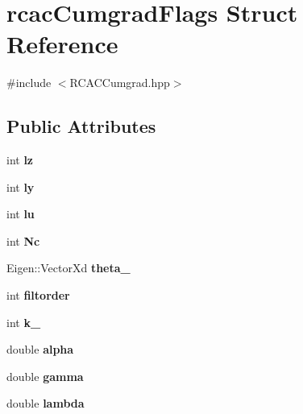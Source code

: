 \hypertarget{structrcac_cumgrad_flags}{}\section{rcac\+Cumgrad\+Flags Struct Reference}
\label{structrcac_cumgrad_flags}


{\ttfamily \#include $<$R\+C\+A\+C\+Cumgrad.\+hpp$>$}

\subsection*{Public Attributes}
\begin{DoxyCompactItemize}
\item 
\mbox{\label{structrcac_cumgrad_flags_ae69efcbfeafcb0a10385a923cb1e9aba}} 
int {\bfseries lz}
\item 
\mbox{\label{structrcac_cumgrad_flags_a1372d7561b3a8f3fe00cd51305ef177b}} 
int {\bfseries ly}
\item 
\mbox{\label{structrcac_cumgrad_flags_a5b724b3a874057c33058d47567e9b519}} 
int {\bfseries lu}
\item 
\mbox{\label{structrcac_cumgrad_flags_a1492e06fc412a49d105d63e47c491b23}} 
int {\bfseries Nc}
\item 
\mbox{\label{structrcac_cumgrad_flags_a9deebbd1c765fcf57fc65cf0d02fc0c2}} 
Eigen\+::\+Vector\+Xd {\bfseries theta\+\_}
\item 
\mbox{\label{structrcac_cumgrad_flags_ae2af882c2622317cf6aa68bd3e2aa7d3}} 
int {\bfseries filtorder}
\item 
\mbox{\label{structrcac_cumgrad_flags_a27af563cf27ad3ec5ad7d7b74fa3aaf7}} 
int {\bfseries k\+\_}
\item 
\mbox{\label{structrcac_cumgrad_flags_ad7587ead9fff9d79f931f63af48e949b}} 
double {\bfseries alpha}
\item 
\mbox{\label{structrcac_cumgrad_flags_a81df90a64a670a750a206b4b0729ac71}} 
double {\bfseries gamma}
\item 
\mbox{\label{structrcac_cumgrad_flags_a0d2104761c5640affa1badc00563317e}} 
double {\bfseries lambda}
\end{DoxyCompactItemize}



